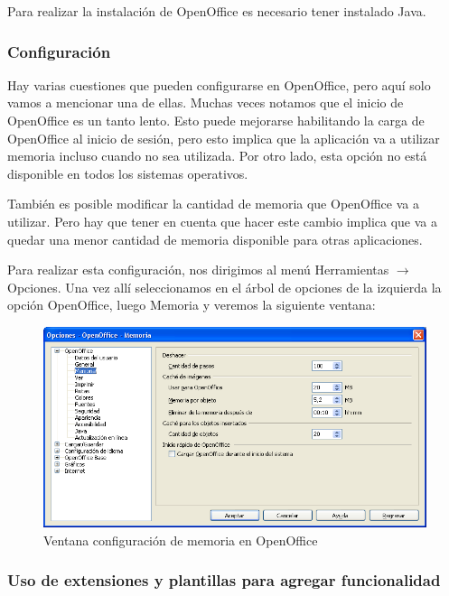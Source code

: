 \documentclass[12pt]{article}
\begin{document}
Para realizar la instalación de OpenOffice es necesario tener instalado Java. 

\subsubsection{Configuración}

Hay varias cuestiones que pueden configurarse en OpenOffice, pero aquí solo vamos a mencionar una de ellas. Muchas veces notamos que el inicio de OpenOffice es un tanto lento. Esto puede mejorarse habilitando la carga de OpenOffice al inicio de sesión, pero esto implica que la aplicación va a utilizar memoria incluso cuando no sea utilizada. Por otro lado, esta opción no está disponible en todos los sistemas operativos.

También es posible modificar la cantidad de memoria que OpenOffice va a utilizar. Pero hay que tener en cuenta que hacer este cambio implica que va a quedar una menor cantidad de memoria disponible para otras aplicaciones. 

Para realizar esta configuración, nos dirigimos al menú Herramientas $ \rightarrow $ Opciones. Una vez allí seleccionamos en el árbol de opciones de la izquierda la opción OpenOffice, luego Memoria y veremos la siguiente ventana:

\begin{figure}[H]
\centering
\includegraphics[width=1\textwidth]{configuracion_memoria_OO.png}
\renewcommand{\figurename}{Fig.}
\caption{Ventana configuración de memoria en OpenOffice}
\label{contexto:figura}
\end{figure}


\subsubsection{Uso de extensiones y plantillas para agregar funcionalidad}
\end{document}
